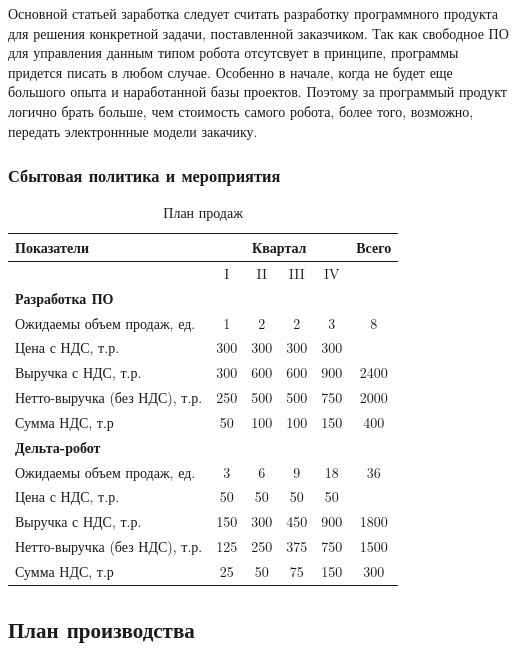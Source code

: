 Основной статьей заработка следует считать разработку программного продукта для решения конкретной задачи, поставленной заказчиком. Так как свободное ПО для управления данным типом робота отсутсвует в принципе, программы придется писать в любом случае. Особенно в начале, когда не будет еще большого опыта и наработанной базы проектов. Поэтому за программый продукт логично брать больше, чем стоимость самого робота, более того, возможно, передать электроннные модели закачику.

\subsubsection{Сбытовая политика и мероприятия}
\begin{table}[h!]
    \centering
\begin{tabular}{|l|c|c|c|c|c|}
\hline
Показатели &\multicolumn{4}{|c|}{Квартал}   & Всего\\
\hline
           & I & II & III & IV & \\ 
\hline
\textbf{Разработка ПО}  & &  &  &  &  \\
\hline
Ожидаемы объем продаж, ед.  & 1  & 2  & 2  & 3  & 8  \\
\hline
Цена с НДС, т.р.  & 300  & 300  & 300  & 300  &  \\
\hline
Выручка с НДС, т.р.   & 300  & 600  & 600  & 900  & 2400 \\
\hline
Нетто-выручка (без НДС), т.р.  & 250   & 500  & 500  & 750  & 2000 \\
\hline
Сумма НДС, т.р   & 50  & 100 & 100  & 150  & 400 \\
\hline
\textbf{Дельта-робот}  & &  &  &  &  \\
\hline
Ожидаемы объем продаж, ед.  & 3 & 6  & 9  & 18  & 36  \\
\hline
Цена с НДС, т.р.  & 50  & 50  & 50  & 50  &  \\
\hline
Выручка с НДС, т.р.   & 150  & 300 & 450  & 900  & 1800 \\
\hline
Нетто-выручка (без НДС), т.р.  & 125  & 250  & 375  & 750  & 1500 \\
\hline
Сумма НДС, т.р   & 25   & 50  & 75  & 150  & 300 \\
\hline
\end{tabular}
\caption{План продаж}
\end{table}



\subsection{План производства}
                            
